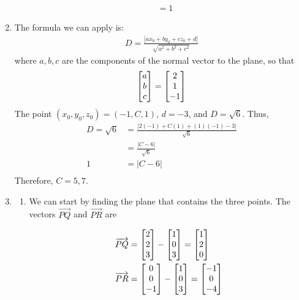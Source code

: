 \documentclass{article}
\begin{document}
\begin{enumerate}
\begin{align*}
  &= 1
\end{align*}
\item 
The formula we can apply is:
\begin{align*}
  D = \frac{| ax_0 + by_0 +cz_0 +d|}{\sqrt{a^2+b^2+c^2}}
\end{align*}
where $a, b, c$ are the components of the normal vector to the plane, so that
\begin{align*}
  \begin{bmatrix} a \\ b \\ c \end{bmatrix} = \begin{bmatrix} 2 \\ 1 \\ -1 \end{bmatrix}
\end{align*}
The point $(x_0,y_0,z_0) = (-1 , C, 1)$, $d = -3$, and $D = \sqrt{6}$. Thus,
\begin{align*}
  D = \sqrt{6} &= \frac{| 2(-1) + C(1) + (1)(-1) -3|}{\sqrt{6}}\\
  &= \frac{| C - 6|}{\sqrt{6}}\\
  1 &= | C - 6| \\
\end{align*}
Therefore, $C = 5, 7$.
\item  %
\begin{enumerate}
\item
We can start by finding the plane that contains the three points. The vectors $\overrightarrow{PQ}$ and $\overrightarrow{PR}$ are 

\begin{align*}
\overrightarrow{PQ} &= \begin{bmatrix} 2 \\ 2 \\ 3 \end{bmatrix} - \begin{bmatrix} 1 \\ 0 \\ 3 \end{bmatrix}  = \begin{bmatrix} 1 \\ 2 \\ 0 \end{bmatrix} \\
\overrightarrow{PR} &= \begin{bmatrix} 0 \\ 0 \\ -1 \end{bmatrix} - \begin{bmatrix} 1 \\ 0 \\ 3 \end{bmatrix}  =  \begin{bmatrix} -1 \\ 0 \\ -4 \end{bmatrix}
\end{align*}


\end{enumerate}
\end{enumerate}
\end{document}
